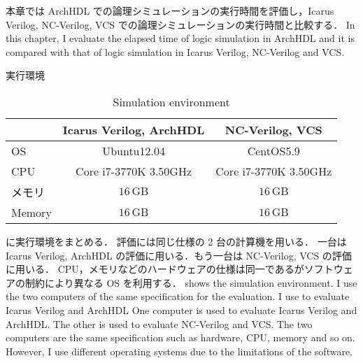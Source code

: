 本章では ArchHDL での論理シミュレーションの実行時間を評価し，Icarus Verilog, NC-Verilog, VCS での論理シミュレーションの実行時間と比較する．
\fi
In this chapter, I evaluate the elapsed time of logic simulation in ArchHDL and it is compared with that of logic simulation in Icarus Verilog, NC-Verilog and VCS.

\begin{table}[t]
 \caption{実行環境}
\fi
 \caption{Simulation environment}
 \label{table:exec_env}
 \begin{center}
  \begin{tabular}{l|c|c} \hline
         &  Icarus Verilog, ArchHDL  &  NC-Verilog, VCS   \\ \hline
  OS     &  Ubuntu12.04             &  CentOS5.9        \\
  CPU    &  Core i7-3770K 3.50GHz   &  Core i7-3770K 3.50GHz  \\
\if0
  メモリ  &  $16\,\mathrm{GB}$       &  $16\,\mathrm{GB}$  \\ \hline
\fi
   Memory &  $16\,\mathrm{GB}$       &  $16\,\mathrm{GB}$  \\ \hline
  \end{tabular}
 \end{center}
\end{table}

 に実行環境をまとめる．
評価には同じ仕様の 2 台の計算機を用いる．
一台は Icarus Verilog, ArchHDL の評価に用いる．もう一台は NC-Verilog, VCS の評価に用いる．
CPU，メモリなどのハードウェアの仕様は同一であるがソフトウェアの制約により異なる OS を利用する．
\fi
{} shows the simulation environment.
I use the two computers of the same specification for the evaluation.
I use to evaluate Icarus Verilog and ArchHDL
One computer is used to evaluate Icarus Verilog and ArchHDL.
The other is used to evaluate NC-Verilog and VCS.
The two computers are the same specification such as hardware, CPU, memory and so on.
However, I use different operating systems due to the limitations of the software.


